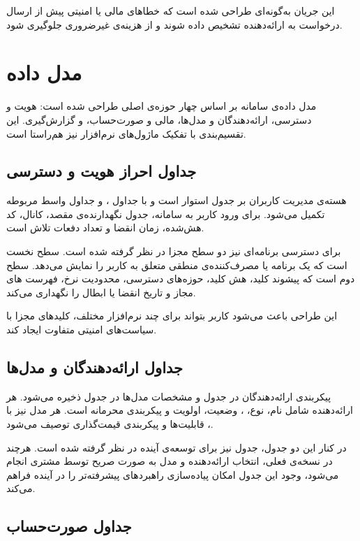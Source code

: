 این جریان به‌گونه‌ای طراحی شده است که خطاهای مالی یا امنیتی پیش از ارسال
درخواست به ارائه‌دهنده تشخیص داده شوند و از هزینه‌ی غیرضروری جلوگیری شود.

\section{مدل داده}

مدل داده‌ی سامانه بر اساس چهار حوزه‌ی اصلی طراحی شده است: هویت و دسترسی،
ارائه‌دهندگان و مدل‌ها، مالی و صورت‌حساب، و گزارش‌گیری. این تقسیم‌بندی با
تفکیک ماژول‌های نرم‌افزار نیز هم‌راستا است.

\subsection{جداول احراز هویت و دسترسی}

هسته‌ی مدیریت کاربران بر جدول  استوار است و با جداول
،  و جداول واسط مربوطه تکمیل می‌شود. برای ورود
کاربر به سامانه، جدول  نگهدارنده‌ی مقصد، کانال، کد
هش‌شده، زمان انقضا و تعداد دفعات تلاش است.

برای دسترسی برنامه‌ای نیز دو سطح مجزا در نظر گرفته شده است. سطح نخست
 است که یک برنامه یا مصرف‌کننده‌ی منطقی متعلق به کاربر
را نمایش می‌دهد. سطح دوم  است که پیشوند کلید، هش کلید،
حوزه‌های دسترسی، محدودیت نرخ، فهرست ‌های مجاز و تاریخ انقضا یا
ابطال را نگهداری می‌کند.

این طراحی باعث می‌شود کاربر بتواند برای چند نرم‌افزار مختلف، کلیدهای
مجزا با سیاست‌های امنیتی متفاوت ایجاد کند.

\subsection{جداول ارائه‌دهندگان و مدل‌ها}

پیکربندی ارائه‌دهندگان در جدول  و مشخصات مدل‌ها در جدول
 ذخیره می‌شود. هر ارائه‌دهنده شامل نام، نوع،
، وضعیت، اولویت و پیکربندی محرمانه است. هر مدل نیز با
، قابلیت‌ها و پیکربندی قیمت‌گذاری توصیف می‌شود.

در کنار این دو جدول، جدول  نیز برای توسعه‌ی آینده در
نظر گرفته شده است. هرچند در نسخه‌ی فعلی، انتخاب ارائه‌دهنده و مدل به
صورت صریح توسط مشتری انجام می‌شود، وجود این جدول امکان پیاده‌سازی
راهبردهای پیشرفته‌تر را در آینده فراهم می‌کند.

\subsection{جداول صورت‌حساب}

